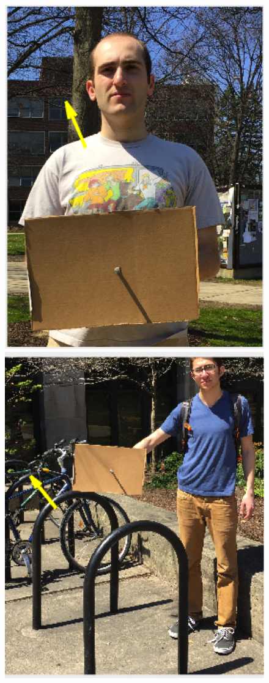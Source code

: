 \documentclass[10pt,twocolumn,letterpaper]{article}
\begin{document}
\begin{figure}[h]
\center
\includegraphics[scale = 0.3]{nathan.png}
\includegraphics[scale = 0.3]{zander.png}

\end{figure}
\end{document}
